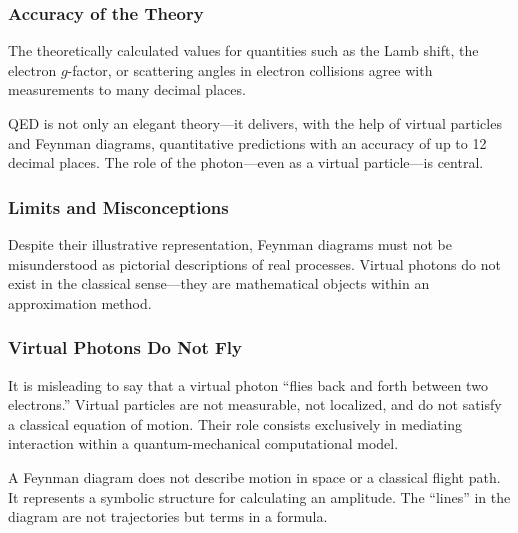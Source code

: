 \subsubsection*{Accuracy of the Theory}
The theoretically calculated values for quantities such as the Lamb shift, the electron $g$-factor, or scattering angles in electron collisions agree with measurements to many decimal places.

\vspace{1em}
\begin{tcolorbox}[didaktikbox, title=Quantum Electrodynamics as a Success Story]
	\label{box:Die Quantenelekrodynamik}
	QED is not only an elegant theory—it delivers, with the help of virtual particles and Feynman diagrams, quantitative predictions with an accuracy of up to 12 decimal places. The role of the photon—even as a virtual particle—is central.
\end{tcolorbox}

\subsubsection{Limits and Misconceptions}

Despite their illustrative representation, Feynman diagrams must not be misunderstood as pictorial descriptions of real processes. Virtual photons do not exist in the classical sense—they are mathematical objects within an approximation method.

\subsubsection*{Virtual Photons Do Not Fly}
It is misleading to say that a virtual photon “flies back and forth between two electrons.” Virtual particles are not measurable, not localized, and do not satisfy a classical equation of motion. Their role consists exclusively in mediating interaction within a quantum-mechanical computational model.

\vspace{0.5em}
\begin{tcolorbox}[didaktikbox, title=No Particle Trajectory in the Diagram]
	\label{box: Keine Teilchenbahn im Diagramm}
	A Feynman diagram does not describe motion in space or a classical flight path. It represents a symbolic structure for calculating an amplitude. The “lines” in the diagram are not trajectories but terms in a formula.
\end{tcolorbox}

